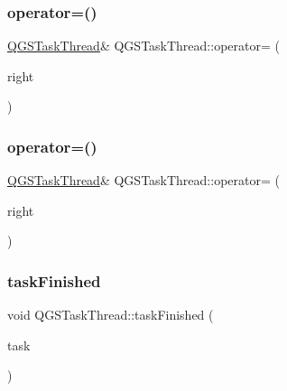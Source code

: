 \mbox{\label{class_q_g_s_task_thread_adaa98adce8918c55d19f6b03c65bba53}} 
\subsubsection{\texorpdfstring{operator=()}{operator=()}\hspace{0.1cm}{\footnotesize\ttfamily [1/2]}}
{\footnotesize\ttfamily \mbox{\hyperlink{class_q_g_s_task_thread}{Q\+G\+S\+Task\+Thread}}\& Q\+G\+S\+Task\+Thread\+::operator= (\begin{DoxyParamCaption}\item[{const \mbox{\hyperlink{class_q_g_s_task_thread}{Q\+G\+S\+Task\+Thread}} \&}]{right }\end{DoxyParamCaption})\hspace{0.3cm}{\ttfamily [delete]}}

\mbox{\label{class_q_g_s_task_thread_a3141da08b3509568dc71c902dacd4527}} 
\subsubsection{\texorpdfstring{operator=()}{operator=()}\hspace{0.1cm}{\footnotesize\ttfamily [2/2]}}
{\footnotesize\ttfamily \mbox{\hyperlink{class_q_g_s_task_thread}{Q\+G\+S\+Task\+Thread}}\& Q\+G\+S\+Task\+Thread\+::operator= (\begin{DoxyParamCaption}\item[{\mbox{\hyperlink{class_q_g_s_task_thread}{Q\+G\+S\+Task\+Thread}} \&\&}]{right }\end{DoxyParamCaption})\hspace{0.3cm}{\ttfamily [delete]}}

\mbox{\label{class_q_g_s_task_thread_aff58714c3d2f405e35027ad7d4edf405}} 
\subsubsection{\texorpdfstring{task\+Finished}{taskFinished}}
{\footnotesize\ttfamily void Q\+G\+S\+Task\+Thread\+::task\+Finished (\begin{DoxyParamCaption}\item[{\mbox{\hyperlink{class_q_g_s_task}{Q\+G\+S\+Task}} $\ast$}]{task }\end{DoxyParamCaption})\hspace{0.3cm}{\ttfamily [signal]}}

